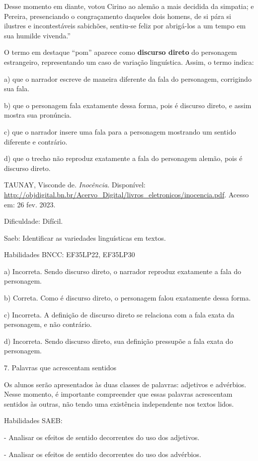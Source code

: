 Desse momento em diante, votou Cirino ao alemão a mais decidida da
simpatia; e Pereira, presenciando o congraçamento daqueles dois homens,
de si pára si ilustres e incontestáveis sabichões, sentiu-se feliz por
abrigá-los a um tempo em sua humilde vivenda.''

O termo em destaque ``pom'' aparece como \textbf{discurso direto} do
personagem estrangeiro, representando um caso de variação linguística.
Assim, o termo indica:

a) que o narrador escreve de maneira diferente da fala do personagem,
corrigindo sua fala.

b) que o personagem fala exatamente dessa forma, pois é discurso direto,
e assim mostra sua pronúncia.

c) que o narrador insere uma fala para a personagem mostrando um sentido
diferente e contrário.

d) que o trecho não reproduz exatamente a fala do personagem alemão,
pois é discurso direto.

TAUNAY, Visconde de. \emph{Inocência}. Disponível:
\url{http://objdigital.bn.br/Acervo_Digital/livros_eletronicos/inocencia.pdf}.
Acesso em: 26 fev. 2023.

Dificuldade: Difícil.

Saeb: Identificar as variedades linguísticas em textos.

Habilidades BNCC: EF35LP22, EF35LP30

a) Incorreta. Sendo discurso direto, o narrador reproduz exatamente a
fala do personagem.

b) Correta. Como é discurso direto, o personagem falou exatamente dessa
forma.

c) Incorreta. A definição de discurso direto se relaciona com a fala
exata da personagem, e não contrário.

d) Incorreta. Sendo discurso direto, sua definição pressupõe a fala
exata do personagem.

7. Palavras que acrescentam sentidos

Os alunos serão apresentados às duas classes de palavras: adjetivos e
advérbios. Nesse momento, é importante compreender que essas palavras
acrescentam sentidos às outras, não tendo uma existência independente
nos textos lidos.

Habilidades SAEB:

- Analisar os efeitos de sentido decorrentes do uso dos adjetivos.

- Analisar os efeitos de sentido decorrentes do uso dos advérbios.

